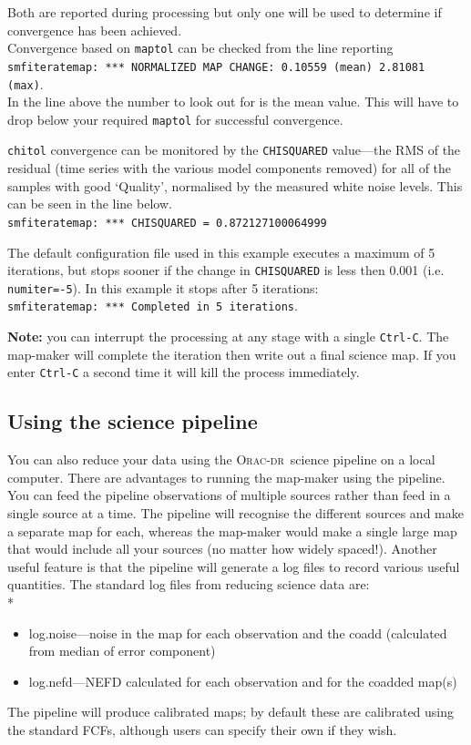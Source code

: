 \documentclass[twoside,11pt]{article}
\newcommand{\htmladdnormallink}[2]{#1}
\newcommand{\xlabel}[1]{}
\renewcommand{\_}{\texttt{\symbol{95}}}
\newcommand{\oracdr}{\htmladdnormallink{\textsc{Orac-dr}}{http://www.oracdr.org/oracdr}}
\begin{document}
Both are reported during processing but only one will be used to determine
if convergence has been achieved.
\\
Convergence based on \texttt{maptol} can be checked from the line
reporting\\
\hspace{5mm}\texttt{smf\_iteratemap: *** NORMALIZED MAP
CHANGE: 0.10559 (mean) 2.81081 (max)}.\\
In the line above the number to look out for is the mean value. This
will have to drop below your required \texttt{maptol} for successful
convergence.

\texttt{chitol} convergence can be monitored by the
\texttt{CHISQUARED} value---the RMS of the residual (time series with
the various model components removed) for all of the samples with good
`Quality', normalised by the measured white noise levels. This can be
seen in the line below.\\
\hspace{0.5cm}\texttt{smf\_iteratemap: *** CHISQUARED = 0.872127100064999}


The default configuration file used in this example executes a maximum
of 5 iterations, but stops sooner if the change in \texttt{CHISQUARED}
is less then 0.001 (i.e. \texttt{numiter=-5}). In this example it
stops after 5 iterations: \\
\texttt{smf\_iteratemap: *** Completed in 5 iterations}.


\textbf{Note:} you can interrupt the processing at any stage with a
single \texttt{Ctrl-C}. The map-maker will complete the iteration then write
out a final science map. If you enter \texttt{Ctrl-C} a second time it will
kill the process immediately.

\subsection{\xlabel{sciencepl}Using the science pipeline}

You can also reduce your data using the \oracdr\ science pipeline on a
local computer. There are advantages to running the map-maker using
the pipeline. You can feed the pipeline observations of multiple
sources rather than feed in a single source at a time. The pipeline
will recognise the different sources and make a separate map for each,
whereas the map-maker would make a single large map that would include
all your sources (no matter how widely spaced!). Another useful
feature is that the pipeline will generate a log files to record
various useful quantities. The standard log files from reducing
science data are:
\\*
\begin{itemize}
\item log.noise---noise in the map for each observation and the coadd
(calculated from median of error component)
\item log.nefd---NEFD calculated for each observation and for the coadded map(s)
\end{itemize}
The pipeline will produce calibrated maps; by default these are
calibrated using the standard FCFs, although users can specify their
own if they wish.
\end{document}
